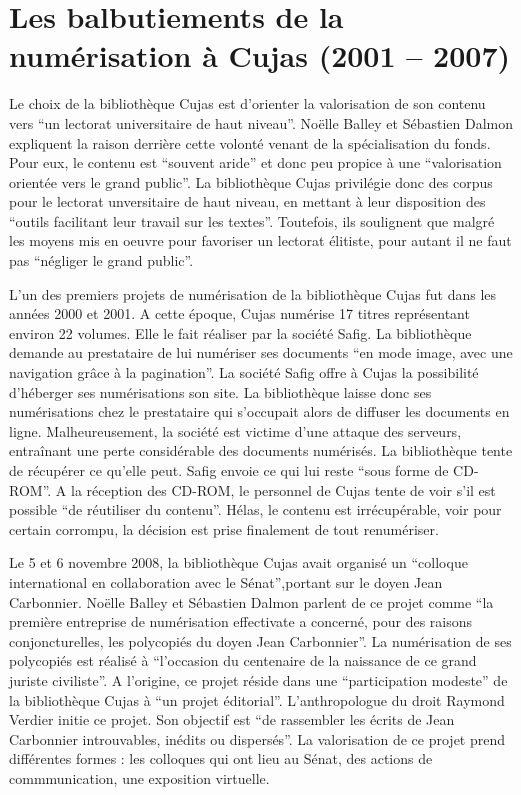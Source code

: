 \section[Numérisation à Cujas]{Les balbutiements de la numérisation à Cujas (2001 – 2007)}

Le choix de la bibliothèque Cujas est d'orienter la valorisation de son contenu vers \enquote{un lectorat universitaire de haut niveau}. Noëlle Balley et Sébastien Dalmon expliquent la raison derrière cette volonté venant de la spécialisation du fonds. Pour eux, le contenu est \enquote{souvent aride} et donc peu propice à une \enquote{valorisation orientée vers le grand public}. La bibliothèque Cujas privilégie donc des corpus pour le lectorat unversitaire de haut niveau, en mettant à leur disposition des \enquote{outils facilitant leur travail sur les textes}. Toutefois, ils soulignent que malgré les moyens mis en oeuvre pour favoriser un lectorat élitiste, pour autant il ne faut pas \enquote{négliger le grand public}.

L'un des premiers projets de numérisation de la bibliothèque Cujas fut dans les années 2000 et 2001. A cette époque, Cujas numérise 17 titres représentant environ 22 volumes. Elle le fait réaliser par la société Safig. La bibliothèque demande au prestataire de lui numériser ses documents \enquote{en mode image, avec une navigation grâce à la pagination}. La société Safig offre à Cujas la possibilité d'héberger ses numérisations son site. La bibliothèque laisse donc ses numérisations chez le prestataire qui s'occupait alors de diffuser les documents en ligne. Malheureusement, la société est victime d'une attaque des serveurs, entraînant une perte considérable des documents numérisés. La bibliothèque tente de récupérer ce qu'elle peut. Safig envoie ce qui lui reste \enquote{sous forme de CD-ROM}. A la réception des CD-ROM, le personnel de Cujas tente de voir s'il est possible \enquote{de réutiliser du contenu}. Hélas, le contenu est irrécupérable, voir pour certain corrompu, la décision est prise finalement de tout renumériser.

Le 5 et 6 novembre 2008, la bibliothèque Cujas avait organisé un \enquote{colloque international en collaboration avec le Sénat},portant sur le doyen Jean Carbonnier. Noëlle Balley et Sébastien Dalmon parlent de ce projet comme \enquote{la première entreprise de numérisation effectivate a concerné, pour des raisons conjoncturelles, les polycopiés du doyen Jean Carbonnier}. La numérisation de ses polycopiés est réalisé à \enquote{l'occasion du centenaire de la naissance de ce grand juriste civiliste}. A l'origine, ce projet réside dans une \enquote{participation modeste} de la bibliothèque Cujas à \enquote{un projet éditorial}. L'anthropologue du droit Raymond Verdier initie ce projet. Son objectif est \enquote{de rassembler les écrits de Jean Carbonnier introuvables, inédits ou dispersés}. La valorisation de ce projet prend différentes formes : les colloques qui ont lieu au Sénat, des actions de commmunication, une exposition virtuelle.

